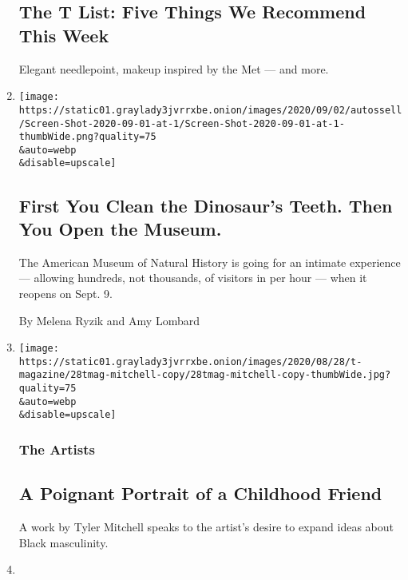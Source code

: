 \begin{enumerate}
  \hypertarget{the-t-list-five-things-we-recommend-this-week}{%
  \subsection{The T List: Five Things We Recommend This
  Week}\label{the-t-list-five-things-we-recommend-this-week}}

  Elegant needlepoint, makeup inspired by the Met --- and more.
\item
  \href{/2020/09/02/arts/design/natural-history-museum-reopening.html}{}

  \texttt{[image: https://static01.graylady3jvrrxbe.onion/images/2020/09/02/autossell/Screen-Shot-2020-09-01-at-1/Screen-Shot-2020-09-01-at-1-thumbWide.png?quality=75\\\&auto=webp\\\&disable=upscale]}

  \hypertarget{first-you-clean-the-dinosaurs-teeth-then-you-open-the-museum}{%
  \subsection{First You Clean the Dinosaur's Teeth. Then You Open the
  Museum.}\label{first-you-clean-the-dinosaurs-teeth-then-you-open-the-museum}}

  The American Museum of Natural History is going for an intimate
  experience --- allowing hundreds, not thousands, of visitors in per
  hour --- when it reopens on Sept. 9.

  By Melena Ryzik and Amy Lombard
\item
  \href{/2020/08/28/t-magazine/tyler-mitchell-photographer-artist.html}{}

  \texttt{[image: https://static01.graylady3jvrrxbe.onion/images/2020/08/28/t-magazine/28tmag-mitchell-copy/28tmag-mitchell-copy-thumbWide.jpg?quality=75\\\&auto=webp\\\&disable=upscale]}

  \hypertarget{the-artists}{%
  \subsubsection{The Artists}\label{the-artists}}

  \hypertarget{a-poignant-portrait-of-a-childhood-friend}{%
  \subsection{A Poignant Portrait of a Childhood
  Friend}\label{a-poignant-portrait-of-a-childhood-friend}}

  A work by Tyler Mitchell speaks to the artist's desire to expand ideas
  about Black masculinity.
\item
  \href{/2020/08/28/arts/design/metropolitan-museum-moma-reopening.html}{}


\end{enumerate}

